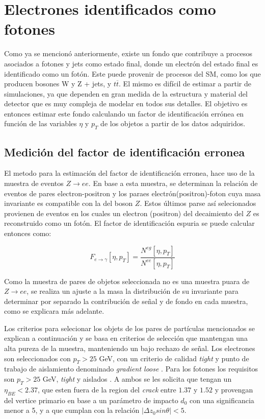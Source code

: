 \chapter{Electrones identificados como fotones}\label{ch:e_fake}

Como ya se mencionó anteriormente, existe un fondo que contribuye a procesos asociados a fotones y jets como estado final, donde un electrón del estado final es identificado como un fotón. Este puede provenir de procesos del SM, como los que producen bosones W y Z + jets, y $t \overline{t}$. El mismo es difícil de estimar a partir de simulaciones, ya que dependen en gran medida de la estructura y material del detector que es muy compleja de modelar en todos sus detalles. El objetivo es entonces estimar este fondo calculando un factor de identificación errónea en función de las variables $\eta$ y $p_{T}$ de los objetos a partir de los datos adquiridos.

\section{Medición del factor de identificación erronea}

El metodo para la estimación del factor de identificación erronea, hace uso de la muestra de eventos $Z\rightarrow ee$. En base a esta muestra, se determinan la relación de eventos de pares electron-positron y los paraes electrón(positron)-foton cuya masa invariante es compatible con la del boson $Z$. Estos últimos parse así selecionados provienen de eventos en los cuales un electron (positron) del decaimiento del $Z$ es reconstruido como un fotón. El factor de identificación espuria se puede calcular entonces como: 

\begin{equation}
F_{e\rightarrow\gamma}[\eta , p_{T}]=\frac{N^{eg}[\eta , p_{T}]}{N^{ee}[\eta , p_{T}]} \label{eq:ff_ratio}
\end{equation}

Como la muestra de pares de objetos seleccionada no es una muestra puara de $Z\rightarrow ee$, se realiza un ajuste a la masa la distribución de su invariante para determinar por separado la contribución de señal y de fondo en cada muestra, como se explicara más adelante.

Los criterios para selecionar los objets de los pares de partículas mencionados se explican a continuación y se basa en criterios de selección que mantengan una alta pureza de la muestra, manteniendo un bajo rechazo de señal.
Los electrones  son seleccionados con $p_{T} > 25$ GeV, con un criterio de calidad \textit{tight} y punto de trabajo de aislamiento denominado \textit{gradient loose} \cite{ATLAS-CONF-2016-024}. Para los fotones los requisitos son $p_{T} > 25$ GeV, \textit{tight} y aislados \cite{STDM-2010-08}. A ambos se les solicita que tengan un $\eta_{BE}<2.37$, que esten fuera de la region del \textit{crack} entre $1.37$ y $1.52$ y provengan del vertice primario en base a un parámetro de impacto $d_{0}$ con una significancia menor a 5, y  a que cumplan con la relación $|\Delta z_{0}sin\theta|<5$.

